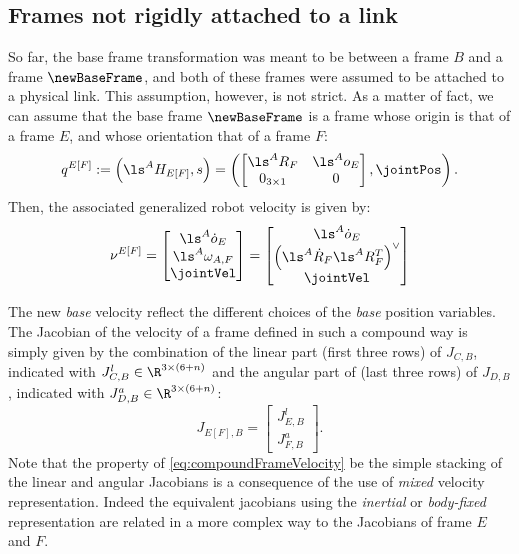 \subsection{Frames not rigidly attached to a link}
\label{subsec:framesNotRigidlyAttachedToALink}
So far, the base frame transformation was meant to be between a frame $B$ and a frame $\newBaseFrame$, and both of these frames were assumed to be attached to a physical link. This assumption, however, is not strict. As a matter of fact, we can  assume that the base frame $\newBaseFrame$  is a  frame whose origin is that of a frame $E$, and whose orientation that of a frame $F$: 
\begin{equation}
q^{E[F]} 
:= 
\left( 
\ls^A H_{E[F]}, 
s
\right)
=
\left( 
\begin{bmatrix} 
\ls^A R_F & \ls^A {o}_E \\
0_{3 \times 1} & 0 
\end{bmatrix} 
,  \jointPos  \right).
\end{equation}
Then, the associated generalized robot velocity is given by: 
\begin{equation}
\nu^{E[F]} = 
\begin{bmatrix}
\ls^A \dot{o}_E \\
\ls^A \omega_{A,F} \\ 
\jointVel
\end{bmatrix} 
= 
\begin{bmatrix}
\ls^A \dot{o}_E \\
 \left(\ls^A\dot{R}_{F} \ls^A {R}_{F}^{T} \right)^\vee \\ 
\jointVel
\end{bmatrix} 
\end{equation}

The new \emph{base} velocity reflect the different choices of the \emph{base} position variables. The Jacobian of the velocity of a frame defined in such a compound way 
is simply given by the combination of the linear part (first three rows) of $J_{C,B}$, indicated with $J_{C,B}^l \in \R^{3 \times (6+n)}$ and the angular part of (last three rows) of $J_{D,B}$, indicated with $J_{D,B}^a \in \R^{3 \times (6+n)}$: 
\begin{equation}
\label{eq:compoundFrameVelocity}
J_{E[F],B} = 
\begin{bmatrix} 
J_{E,B}^l \\
J_{F,B}^a
\end{bmatrix}.
\end{equation}
Note that the property of \eqref{eq:compoundFrameVelocity} be the simple stacking of the linear and angular Jacobians is a consequence of the use of \emph{mixed} velocity representation.  Indeed the equivalent jacobians using the \emph{inertial} or \emph{body-fixed} representation are related in a more complex way to the Jacobians of frame $E$ and $F$.

